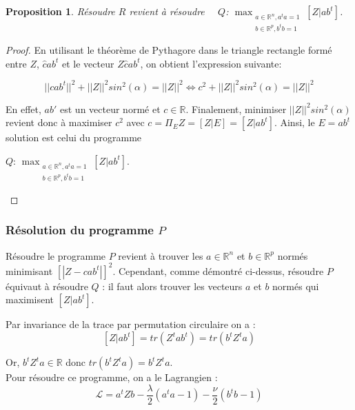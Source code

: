 \documentclass[12pt, openany, fleqn, french]{article}
\newtheorem{prop}[theo]{Proposition}    %
\begin{document}
\begin{prop}
    Résoudre $R$ revient à résoudre  ~~$Q$: $\displaystyle \max_{\substack{ a \in \mathbb{R}^{n}, a^{t}a=1 \\ b \in \mathbb{R}^{p} , b^{t}b=1}}[Z|ab^t]$. 
\end{prop}

\begin{proof}
        En utilisant le théorème de Pythagore dans le triangle rectangle formé entre $Z$, $\hat{c}ab^t$ et le vecteur $Z\hat{c}ab^t$, on obtient l'expression suivante:
    
        $$||cab^t||^2 + ||Z||^2sin^2(\alpha) = ||Z||^2
    \Leftrightarrow c^2 + ||Z||^2 sin^2(\alpha) = ||Z||^2
    $$

    En effet, $ab'$ est un vecteur normé et $c\in\mathbb{R}$. Finalement, minimiser $||Z||^2sin^2(\alpha)$ revient donc à maximiser $c^2$ avec $c = \Pi_EZ = [Z|E]= [Z|ab^t]$. Ainsi, le $E= ab^t$ solution est celui du programme 
    \begin{center}
        $Q$: $\displaystyle \max_{\substack{ a \in \mathbb{R}^{n}, a^{t}a=1 \\ b \in \mathbb{R}^{p} , b^{t}b=1}}[Z|ab^t]$. 
    \end{center}
    
\end{proof}



\subsubsection{Résolution du programme $P$}

    Résoudre le programme $P$ revient à trouver les $a\in\mathbb{R}^n$ et $b\in\mathbb{R}^p$ normés minimisant $[|Z - cab^t|]^2$. Cependant, comme démontré ci-dessus, résoudre $P$ équivaut à résoudre $Q$ : il faut alors trouver les vecteurs $a$ et $b$ normés qui maximisent $[Z|ab^t]$. 
    
    Par invariance de la trace par permutation circulaire on a : $$[Z|ab^t] = tr(Z^tab^t) = tr(b^t Z^t a)$$ 
    
    Or,  $b^t Z^t a \in \mathbb{R}$ donc $tr(b^t Z^t a) = b^t Z^t a$.\\ 

    Pour résoudre ce programme, on a le Lagrangien :
    $$\mathcal{L} = a^tZb - \frac{\lambda}{2}(a^ta-1) - \frac{\nu}{2}(b^tb-1)$$
    
\end{document}
